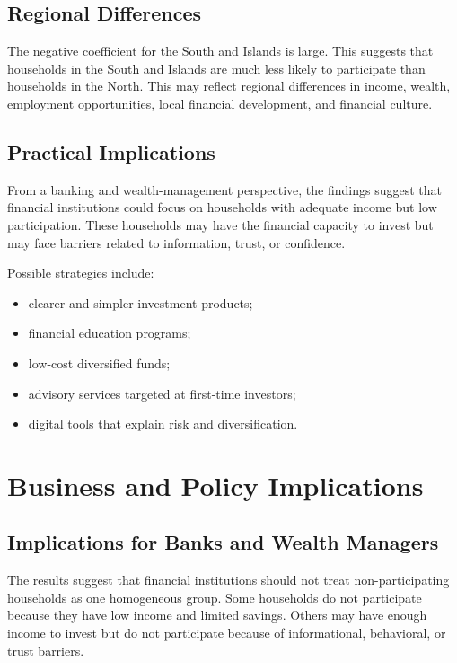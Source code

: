 \documentclass[12pt]{article}
\begin{document}
\subsection{Regional Differences}

The negative coefficient for the South and Islands is large. This suggests that households in the South and Islands are much less likely to participate than households in the North. This may reflect regional differences in income, wealth, employment opportunities, local financial development, and financial culture.

\subsection{Practical Implications}

From a banking and wealth-management perspective, the findings suggest that financial institutions could focus on households with adequate income but low participation. These households may have the financial capacity to invest but may face barriers related to information, trust, or confidence.

Possible strategies include:

\begin{itemize}[leftmargin=*]
    \item clearer and simpler investment products;
    \item financial education programs;
    \item low-cost diversified funds;
    \item advisory services targeted at first-time investors;
    \item digital tools that explain risk and diversification.
\end{itemize}

\section{Business and Policy Implications}

\subsection{Implications for Banks and Wealth Managers}

The results suggest that financial institutions should not treat non-participating households as one homogeneous group. Some households do not participate because they have low income and limited savings. Others may have enough income to invest but do not participate because of informational, behavioral, or trust barriers.
\end{document}
